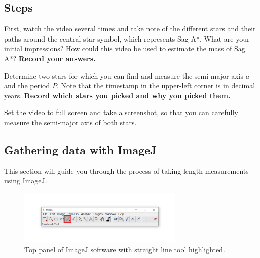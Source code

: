 \subsection{Steps}
\begin{steps}
	\item First, watch the video several times and take note of the different stars and their paths around the central star symbol, which represents Sag A*. What are your initial impressions? How could this video be used to estimate the mass of Sag A*? \textbf{Record your answers.}

	\item Determine two stars for which you can find and measure the semi-major axis $a$ and the period $P$. Note that the timestamp in the upper-left corner is in decimal years. \textbf{Record which stars you picked and why you picked them.}
	
	\item Set the video to full screen and take a screenshot, so that you can carefully measure the semi-major axis of both stars.

\end{steps}
	
\subsection{Gathering data with ImageJ}

This section will guide you through the process of taking length measurements using ImageJ.
\begin{figure}[h]
	\centering
	\includegraphics[width=0.7\textwidth]{galactic-center/line_tool.png}
	\caption {Top panel of ImageJ software with straight line tool highlighted.}
	\label{gc:fig:linetool}
\end{figure}

